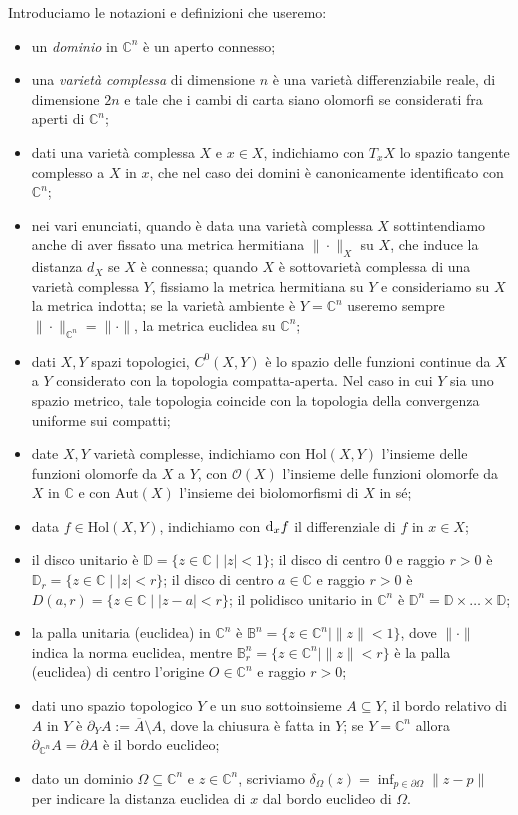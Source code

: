 Introduciamo le notazioni e definizioni che useremo:
\begin{itemize}
    \item  un \textit{dominio} in $\mathbb{C}^n$ è un aperto connesso;
    \item una \textit{varietà complessa} di dimensione $n$ è una varietà differenziabile reale, di dimensione $2n$ e tale che i cambi di carta siano olomorfi se considerati fra aperti di $\mathbb{C}^n$;
    \item dati una varietà complessa $X$ e $x \in X$, indichiamo con $T_xX$ lo spazio tangente complesso a $X$ in $x$, che nel caso dei domini è canonicamente identificato con $\mathbb{C}^n$;
    \item nei vari enunciati, quando è data una varietà complessa $X$ sottintendiamo anche di aver fissato una metrica hermitiana $\|\cdot\|_X$ su $X$, che induce la distanza $d_X$ se $X$ è connessa; quando $X$ è sottovarietà complessa di una varietà complessa $Y$, fissiamo la metrica hermitiana su $Y$ e consideriamo su $X$ la metrica indotta; se la varietà ambiente è $Y=\mathbb{C}^n$ useremo sempre $\|\cdot\|_{\mathbb{C}^n}=\|\cdot\|$, la metrica euclidea su $\mathbb{C}^n$;
    \item dati $X,Y$ spazi topologici, $C^0(X,Y)$ è lo spazio delle funzioni continue da $X$ a $Y$ considerato con la topologia compatta-aperta. Nel caso in cui $Y$ sia uno spazio metrico, tale topologia coincide con la topologia della convergenza uniforme sui compatti;
    \item date $X,Y$ varietà complesse, indichiamo con $\text{Hol}(X,Y)$ l'insieme delle funzioni olomorfe da $X$ a $Y$, con $\mathcal{O}(X)$ l'insieme delle funzioni olomorfe da $X$ in $\mathbb{C}$ e con $\text{Aut}(X)$ l'insieme dei biolomorfismi di $X$ in sé;
    \item data $f \in \text{Hol}(X,Y)$, indichiamo con $\mathop{}\!\mathrm{d}_x f$ il differenziale di $f$ in $x \in X$;
    \item il disco unitario è $\mathbb{D}=\{z \in \mathbb{C} \mid |z|<1\}$; il disco di centro $0$ e raggio $r>0$ è $\mathbb{D}_r=\{z \in \mathbb{C} \mid |z|<r\}$; il disco di centro $a\in\mathbb{C}$ e raggio $r>0$ è $D(a,r)=\{z\in\mathbb{C}\mid |z-a|<r\}$; il polidisco unitario in $\mathbb{C}^n$ è $\mathbb{D}^n=\mathbb{D}\times\dots\times\mathbb{D}$;
    \item la palla unitaria (euclidea) in $\mathbb{C}^n$ è $\mathbb{B}^n=\{z \in \mathbb{C}^n \mid \|z\|<1\}$, dove $\|\cdot\|$ indica la norma euclidea, mentre $\mathbb{B}_r^n=\{z \in \mathbb{C}^n \mid \|z\|<r\}$ è la palla (euclidea) di centro l'origine $O\in\mathbb{C}^n$ e raggio $r>0$;
    \item dati uno spazio topologico $Y$ e un suo sottoinsieme $A\subseteq Y$, il bordo relativo di $A$ in $Y$ è $\partial_Y A:=\overline{A}\setminus A$, dove la chiusura è fatta in $Y$; se $Y=\mathbb{C}^n$ allora $\partial_{\mathbb{C}^n}A=\partial A$ è il bordo euclideo;
    \item dato un dominio $\Omega\subseteq\mathbb{C}^n$ e $z \in \mathbb{C}^n$, scriviamo $\delta_\Omega(z)=\displaystyle\inf_{p \in \partial\Omega}\|z-p\|$ per indicare la distanza euclidea di $x$ dal bordo euclideo di $\Omega$.
\end{itemize}

